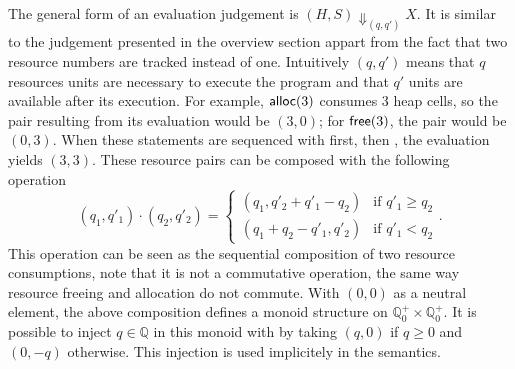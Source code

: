 \documentclass[10pt]{article}
\begin{document}
The general form of an evaluation judgement is
$(H, S) \Downarrow_{(q,q')} X$.  It is similar to the judgement
presented in the overview section appart  from the fact that
two resource numbers are tracked instead of one.  Intuitively
$(q, q')$ means that $q$ resources units are necessary to execute
the program and that $q'$ units are available after its execution.
For example, $\mathsf{alloc}(3)$ consumes 3 heap cells, so
the pair resulting from its evaluation would be $(3, 0)$; for
$\mathsf{free}(3)$, the pair would be $(0, 3)$.  When these
statements are sequenced with  first, then ,
the evaluation yields $(3, 3)$.  These resource pairs can
be composed with the following operation
$$
(q_1, q'_1) \cdot (q_2, q'_2) =
\left\{
\begin{array}{ll}
(q_1, q'_2 + q'_1 - q_2) & \mbox{if } q'_1 \ge q_2 \\
(q_1 + q_2 - q'_1, q'_2) & \mbox{if } q'_1 < q_2
\end{array}
\right.
.
$$
This operation can be seen as the sequential composition of
two resource consumptions, note that it is not a commutative
operation, the same way resource freeing and allocation do not
commute.
With $(0, 0)$ as a neutral element, the above composition defines
a monoid structure on $\mathbb Q_0^+ \times \mathbb Q_0^+$.
It is possible to inject $q \in \mathbb Q$ in this monoid with by taking
$(q, 0)$ if $q \ge 0$ and $(0, -q)$ otherwise.  This injection
is used implicitely in the semantics.
\end{document}
